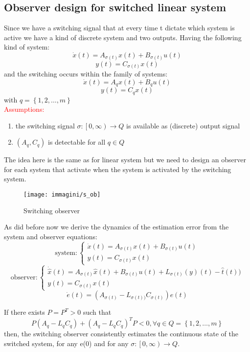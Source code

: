 \subsection{Observer design for switched linear system}
Since we have a switching signal that at every time t dictate which system is active we have a kind of discrete system and two outputs.
\newline
Having the following kind of system:
\[
\dot{x}(t)=A_{\sigma(t)}x(t)+B_{\sigma(t)}u(t)\]
\[
y(t)=C_{\sigma(t)}x(t)
\]
and the switching occurs within the family of systems:
\[
\dot{x}(t)=A_qx(t)+B_qu(t) \]
\[
y(t)=C_qx(t)
\] with $ q=\left\{1,2,\dots,m\right\}$\\
\textcolor{red}{Assumptions:}
\begin{enumerate}
\item[(i)] the switching signal $\sigma\colon \left[0,\infty\right)\to Q$ is available as (discrete) output signal
\item[(ii)] $(A_q,C_q)$ is detectable for all $q\in Q$
\end{enumerate}
The idea here is the same as for linear system but we need to design an observer for each system that activate when the system is activated by the switching system.
\begin{figure}[H]
	\centering
	\texttt{[image: immagini/s\_ob]}
	\caption{Switching observer}
	\label{s_on}
\end{figure}
As did before now we derive the dynamics of the estimation error from the system and observer equations:
\[\text{system}\colon \begin{cases}
	\dot{x}(t)=A_{\sigma(t)}x(t)+B_{\sigma(t)}u(t)\\
	y(t)=C_{\sigma(t)}x(t)
\end{cases}
\]
\[\text{observer}\colon \begin{cases}
	\dot{\hat{x}}(t)=A_{\sigma(t)}\hat{x}(t)+B_{\sigma(t)}u(t)+L_{\sigma(t)}(y)(t)-\hat{t}(t))\\
	y(t)=C_{\sigma(t)}x(t)
\end{cases}
\]
\[
\boxed{\dot{e}(t)=\left( A_{\sigma(t)}-L_{\sigma(t))}C_{\sigma(t)}\right)e(t)}
\]
\begin{thm}
	If there exists $P=P^T>0$ such that \[P(A_q-L_qC_q)+(A_q-L_qC_q)^TP<0, \forall q \in Q=\left\{1,2,\dots,m\right\}\] then, the switching observer consistently estimates the continuous state of the switched system, for any e(0) and for any $\sigma \colon \left[0,\infty\right) \to Q$.
\end{thm}

